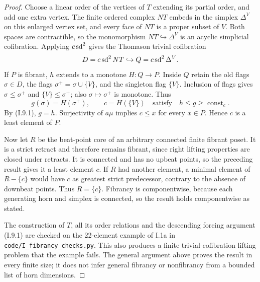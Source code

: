 \begin{proof}
Choose a linear order of the vertices of $T$ extending its partial
order, and add one extra vertex. The finite ordered complex $NT$
embeds in the simplex $\Delta^V$ on this enlarged vertex set, and
every face of $NT$ is a proper subset of $V$. Both spaces are
contractible, so the monomorphism $NT\hookrightarrow\Delta^V$ is
an acyclic simplicial cofibration. Applying $c\operatorname{sd}^2$ gives the
Thomason trivial cofibration
\[
 D=c\operatorname{sd}^2NT\hookrightarrow Q=c\operatorname{sd}^2\Delta^V.
\]
If $P$ is fibrant, $h$ extends to a monotone $H:Q\to P$.
Inside $Q$ retain the old flags $\sigma\in D$, the flags
$\sigma^+=\sigma\cup\{V\}$, and the singleton flag $\{V\}$.
Inclusion of flags gives
$\sigma\leq\sigma^+$ and $\{V\}\leq\sigma^+$;
also $\sigma\mapsto\sigma^+$ is monotone. Thus
\[
 g(\sigma)=H(\sigma^+),\qquad c=H(\{V\})
 \quad\text{satisfy}\quad h\leq g\geq\operatorname{const}_c.
\]
By (I.9.1), $g=h$. Surjectivity of $a\mu$ implies $c\leq x$ for
every $x\in P$. Hence $c$ is a least element of $P$.

Now let $R$ be the beat-point core of an arbitrary connected finite
fibrant poset. It is a strict retract and therefore remains fibrant,
since right lifting properties are closed under retracts. It is
connected and has no upbeat points, so the preceding result gives it
a least element $c$. If $R$ had another element, a minimal element
of $R-\{c\}$ would have $c$ as greatest strict predecessor, contrary
to the absence of downbeat points. Thus $R=\{c\}$.
Fibrancy is componentwise, because each generating horn and simplex
is connected, so the result holds componentwise as stated.

The construction of $T$, all its order relations and the descending
forcing argument (I.9.1) are checked on the 22-element example of
I.1a in \texttt{code/I\_fibrancy\_checks.py}. This also produces a
finite trivial-cofibration lifting problem that the example fails.
The general argument above proves the result in every finite size;
it does not infer general fibrancy or nonfibrancy from a bounded list
of horn dimensions.
\end{proof}

